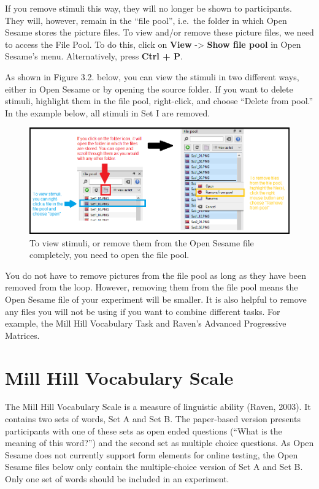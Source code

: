 \documentclass[
]{book}
\begin{document}
If you remove stimuli this way, they will no longer be shown to participants. They will, however, remain in the ``file pool'', i.e.~the folder in which Open Sesame stores the picture files. To view and/or remove these picture files, we need to access the File Pool. To do this, click on \textbf{View} -\textgreater{} \textbf{Show file pool} in Open Sesame's menu. Alternatively, press \textbf{Ctrl + P}.

As shown in Figure 3.2. below, you can view the stimuli in two different ways, either in Open Sesame or by opening the source folder. If you want to delete stimuli, highlight them in the file pool, right-click, and choose ``Delete from pool.'' In the example below, all stimuli in Set I are removed.

\begin{figure}

{\centering \includegraphics[width=0.99\linewidth]{images/AdvancedRPMFilePool} 

}

\caption{To view stimuli, or remove them from the Open Sesame file completely, you need to open the file pool.}\label{fig:Figure1-2}
\end{figure}

You do not have to remove pictures from the file pool as long as they have been removed from the loop. However, removing them from the file pool means the Open Sesame file of your experiment will be smaller. It is also helpful to remove any files you will not be using if you want to combine different tasks. For example, the Mill Hill Vocabulary Task and Raven's Advanced Progressive Matrices.

\hypertarget{mill-hill-vocabulary-scale}{%
\section{Mill Hill Vocabulary Scale}\label{mill-hill-vocabulary-scale}}

The Mill Hill Vocabulary Scale is a measure of linguistic ability (Raven, 2003). It contains two sets of words, Set A and Set B. The paper-based version presents participants with one of these sets as open ended questions (``What is the meaning of this word?'') and the second set as multiple choice questions. As Open Sesame does not currently support form elements for online testing, the Open Sesame files below only contain the multiple-choice version of Set A and Set B. Only one set of words should be included in an experiment.
\end{document}
